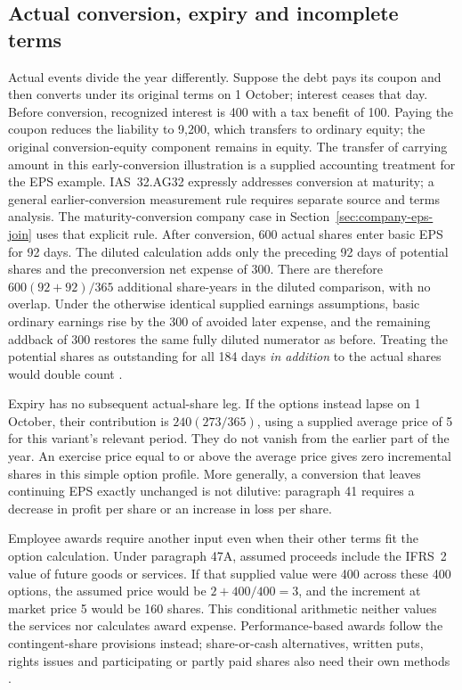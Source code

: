 

\subsection{Actual conversion, expiry and incomplete terms}

Actual events divide the year differently. Suppose the debt pays its coupon
and then converts under its original terms on 1 October; interest ceases
that day. Before conversion, recognized interest is 400 with a tax benefit
of 100. Paying the coupon reduces the liability to 9,200, which transfers
to ordinary equity; the original conversion-equity component remains in equity.
The transfer of carrying amount in this early-conversion illustration is a
supplied accounting treatment for the EPS example. IAS~32.AG32 expressly
addresses conversion at maturity; a general earlier-conversion measurement
rule requires separate source and terms analysis. The maturity-conversion
company case in Section~\ref{sec:company-eps-join} uses that explicit rule.
After conversion, 600 actual shares enter basic EPS for 92 days.
The diluted calculation adds only the preceding 92 days of potential
shares and the preconversion net expense of 300. There are therefore
$600(92+92)/365$ additional share-years in the diluted comparison, with
no overlap. Under the otherwise identical supplied earnings assumptions,
basic ordinary earnings rise by the 300 of avoided later expense, and
the remaining addback of 300 restores the same fully diluted numerator
as before. Treating the potential shares as outstanding for all 184 days
\emph{in addition} to the actual shares would double count
\citep[IAS~33, paragraphs 21(c), 36--38]{eu20231803}.

Expiry has no subsequent actual-share leg. If the options instead lapse
on 1 October, their contribution is $240(273/365)$, using a supplied
average price of 5 for this variant's relevant period. They do not vanish
from the earlier part of the year. An exercise price equal to or above
the average price gives zero incremental shares in this simple option
profile. More generally, a conversion that leaves continuing EPS exactly
unchanged is not dilutive: paragraph 41 requires a decrease in profit
per share or an increase in loss per share.

Employee awards require another input even when their other terms fit
the option calculation. Under paragraph 47A, assumed proceeds include
the IFRS~2 value of future goods or services. If that supplied value were
400 across these 400 options, the assumed price would be
$2+400/400=3$, and the increment at market price 5 would be 160 shares.
This conditional arithmetic neither values the services nor calculates
award expense. Performance-based awards follow the contingent-share
provisions instead; share-or-cash alternatives, written puts, rights
issues and participating or partly paid shares also need their own
methods \citep[IAS~33, paragraphs 47A--63, A2 and A13--A16]{eu20231803}.

